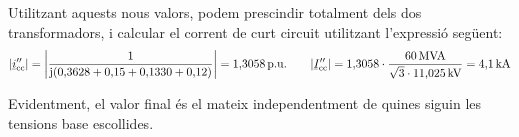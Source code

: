 \begin{exemple}
Utilitzant aquests nous valors, podem prescindir totalment dels dos
transformadors, i calcular el corrent de curt circuit utilitzant
l'expressi\'{o} seg\"{u}ent:
\[
|\cmplx{i}''\ped{cc}| = \left| \frac{1}{\ju ( 0{,}3628 + 0{,}15 +
0{,}1330 + 0{,}12 )} \right| = 1{,}3058\unit{p.u.} \qquad
|\cmplx{I}''\ped{cc}| =
1{,}3058\cdot\frac{60\unit{MVA}}{\sqrt{3}\cdot 11{,}025\unit{kV}} =
4{,}1\unit{kA}
\]

Evidentment, el valor final \'{e}s el mateix independentment de quines
siguin les tensions base escollides.
\end{exemple}
